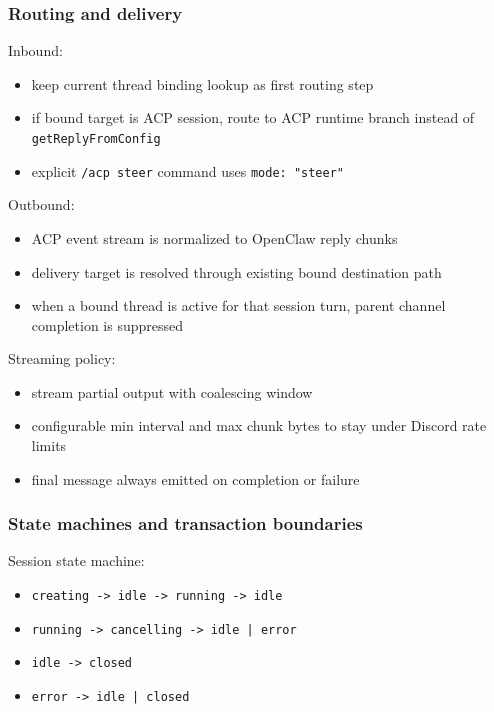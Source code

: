 \subsubsection{Routing and delivery}


Inbound:

\begin{itemize}
  \item keep current thread binding lookup as first routing step
  \item if bound target is ACP session, route to ACP runtime branch instead of \texttt{getReplyFromConfig}
  \item explicit \texttt{/acp steer} command uses \texttt{mode: "steer"}
\end{itemize}


Outbound:

\begin{itemize}
  \item ACP event stream is normalized to OpenClaw reply chunks
  \item delivery target is resolved through existing bound destination path
  \item when a bound thread is active for that session turn, parent channel completion is suppressed
\end{itemize}


Streaming policy:

\begin{itemize}
  \item stream partial output with coalescing window
  \item configurable min interval and max chunk bytes to stay under Discord rate limits
  \item final message always emitted on completion or failure
\end{itemize}


\subsubsection{State machines and transaction boundaries}


Session state machine:

\begin{itemize}
  \item \texttt{creating -> idle -> running -> idle}
  \item \texttt{running -> cancelling -> idle | error}
  \item \texttt{idle -> closed}
  \item \texttt{error -> idle | closed}
\end{itemize}


